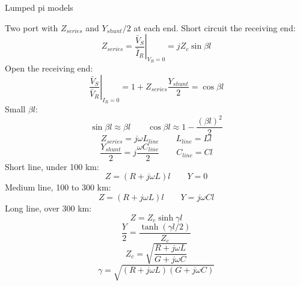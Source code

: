 Lumped pi models

Two port with $Z_{series}$ and $Y_{shunt}/2$ at each end.
Short circuit the receiving end:
$$Z_{series}=\left.\frac{\bar V_S}{\bar I_R}\right|_{V_R=0}=jZ_c\sin\beta l$$
Open the receiving end:
$$\left.\frac{\bar V_S}{\bar V_R}\right|_{I_R=0}=1+Z_{series}\frac{Y_{shunt}}{2}=\cos\beta l$$
Small $\beta l$:
$$\sin\beta l\approx\beta l\qquad \cos\beta l\approx1-\frac{(\beta l)^2}{2}$$
$$Z_{series}=j\omega L_{line}\qquad L_{line}=Ll$$
$$\frac{Y_{shunt}}{2}=j\frac{\omega C_{line}}{2}\qquad C_{line}=Cl$$
Short line, under 100 km:
$$Z=\left(R+j\omega L\right)l\qquad Y=0$$
Medium line, 100 to 300 km:
$$Z=\left(R+j\omega L\right)l\qquad Y=j\omega Cl$$
Long line, over 300 km:
$$Z=Z_c\sinh\gamma l$$
$$\frac{Y}{2}=\frac{\tanh\left(\gamma l/2\right)}{Z_c}$$
$$Z_c=\sqrt{\frac{R+j\omega L}{G+j\omega C}}$$
$$\gamma=\sqrt{\left(R+j\omega L\right)\left(G+j\omega C\right)}$$
